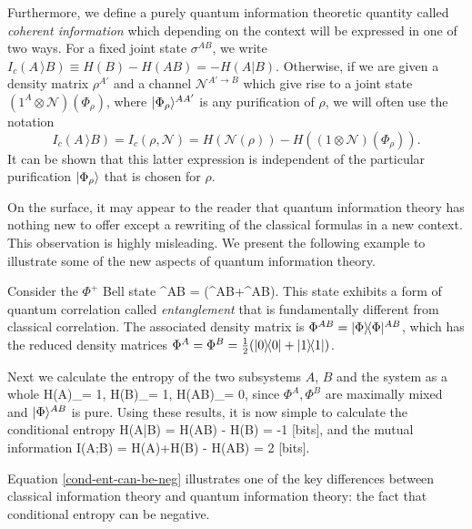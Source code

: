 \documentclass[aps,11pt,twoside,letterpaper]{article}
\newcommand{\mcal}{\mathcal}
\begin{document}
			
			Furthermore, we define a purely quantum information theoretic quantity called \emph{coherent information}
			which depending on the context will be expressed in one of two ways.
			For a fixed joint state $\sigma^{AB}$, we write
			$I_c(A\,\rangle B) \equiv H(B) - H(AB) = -H(A|B).$
			Otherwise, if we are given a density matrix $\rho^{A'}$ and a channel $\mcal{N}^{A'\rightarrow B}$ which give rise to a joint state 
			$(1^A\otimes \mcal{N})(\Phi_\rho)$,
			where $| \Phi_\rho \rangle^{AA'}$ is any purification of $\rho$, we will often use the notation
			\[I_c(A\,\rangle B) = I_c(\rho,\mcal{N}) = H(\mcal{N}(\rho)) - H((1\otimes\mcal{N})(\Phi_\rho)).\]  
			It can be shown that this latter expression is independent of the particular purification $| \Phi_\rho \rangle$ that is chosen for $\rho$.

			
			On the surface, it may appear to the reader that quantum information theory has nothing new to offer except 
			a rewriting of the classical formulas in a new context.
			This observation is highly misleading.
			We present the following example to illustrate some of the new aspects of quantum information theory.
			
			\begin{example}	\label{example:EPR-pair}
				Consider the $\Phi^{+}$\! Bell state 
				\be
					\ket{\Phi}^{AB} = (^{AB}+^{AB}).
				\ee
				This state exhibits a form of quantum correlation called \emph{entanglement} that is fundamentally
				different from classical correlation.
				The associated density matrix is $\Phi^{AB} = | \Phi \rangle\!\langle \Phi |^{AB}$, which has
				the reduced density matrices $\Phi^A = \Phi^B = \tfrac{1}{2}(| 0 \rangle\!\langle 0 | + | 1 \rangle\!\langle 1 |)$.
				
				Next we calculate the entropy of the two subsystems $A$, $B$ and the system as a whole 
				\be
					H(A)_\Phi = 1, 	\qquad
					H(B)_\Phi = 1, 	\qquad
					H(AB)_\Phi = 0,
				\ee
				since $\Phi^A,\Phi^B$ are maximally mixed and $| \Phi \rangle^{AB}$ is pure.
				Using these results, it is now simple to calculate the conditional entropy
				\be	\label{cond-ent-can-be-neg}
					H(A|B)	=	H(AB) - H(B)	= -1 \textup{ [bits]},
				\ee
				and the mutual information
				\be	\label{mutual-inf-can-be-2}
					I(A;B)	=	H(A)+H(B) - H(AB)	= 2 \textup{ [bits]}.
				\ee
			\end{example}
			
			Equation \eqref{cond-ent-can-be-neg} illustrates one of the key differences between classical information
			theory and quantum information theory: the fact that conditional entropy can be negative.
			
\end{document}
